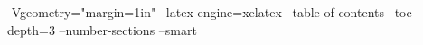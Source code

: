-Vgeometry="margin=1in"
--latex-engine=xelatex
--table-of-contents
--toc-depth=3
--number-sections
--smart
